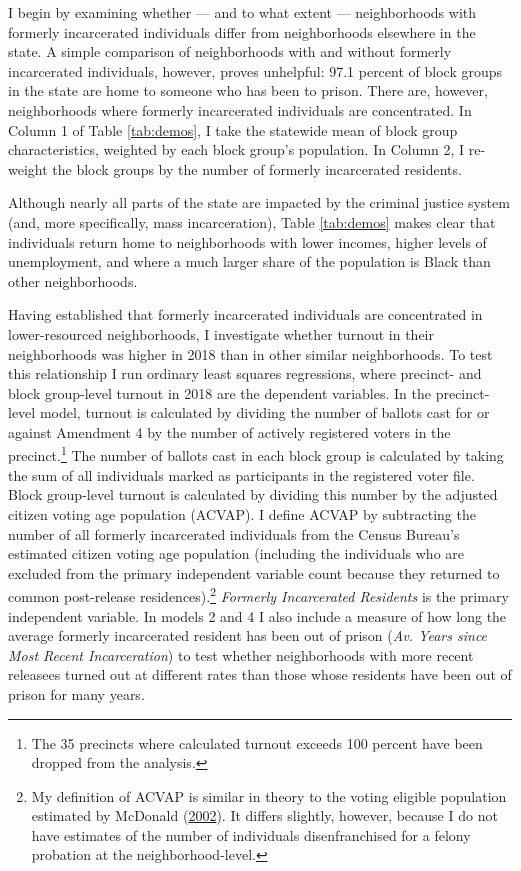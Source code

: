 \documentclass[
  12pt,
]{article}
\begin{document}
I begin by examining whether --- and to what extent --- neighborhoods with formerly incarcerated individuals differ from neighborhoods elsewhere in the state. A simple comparison of neighborhoods with and without formerly incarcerated individuals, however, proves unhelpful: 97.1 percent of block groups in the state are home to someone who has been to prison. There are, however, neighborhoods where formerly incarcerated individuals are concentrated. In Column 1 of Table \ref{tab:demos}, I take the statewide mean of block group characteristics, weighted by each block group's population. In Column 2, I re-weight the block groups by the number of formerly incarcerated residents.



Although nearly all parts of the state are impacted by the criminal justice system (and, more specifically, mass incarceration), Table \ref{tab:demos} makes clear that individuals return home to neighborhoods with lower incomes, higher levels of unemployment, and where a much larger share of the population is Black than other neighborhoods.

Having established that formerly incarcerated individuals are concentrated in lower-resourced neighborhoods, I investigate whether turnout in their neighborhoods was higher in 2018 than in other similar neighborhoods. To test this relationship I run ordinary least squares regressions, where precinct- and block group-level turnout in 2018 are the dependent variables. In the precinct-level model, turnout is calculated by dividing the number of ballots cast for or against Amendment 4 by the number of actively registered voters in the precinct.\footnote{The 35 precincts where calculated turnout exceeds 100 percent have been dropped from the analysis.} The number of ballots cast in each block group is calculated by taking the sum of all individuals marked as participants in the registered voter file. Block group-level turnout is calculated by dividing this number by the adjusted citizen voting age population (ACVAP). I define ACVAP by subtracting the number of all formerly incarcerated individuals from the Census Bureau's estimated citizen voting age population (including the individuals who are excluded from the primary independent variable count because they returned to common post-release residences).\footnote{My definition of ACVAP is similar in theory to the voting eligible population estimated by McDonald (\protect\hyperlink{ref-McDonald2002}{2002}). It differs slightly, however, because I do not have estimates of the number of individuals disenfranchised for a felony probation at the neighborhood-level.} \emph{Formerly Incarcerated Residents} is the primary independent variable. In models 2 and 4 I also include a measure of how long the average formerly incarcerated resident has been out of prison (\emph{Av. Years since Most Recent Incarceration}) to test whether neighborhoods with more recent releasees turned out at different rates than those whose residents have been out of prison for many years.
\end{document}
